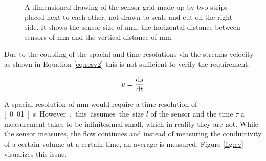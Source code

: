 \begin{figure}[H]
\begin{center}
		\caption{A dimensioned drawing of the sensor grid made up by two strips placed next to each other, not drawn to scale and cut on the right side. It shows the sensor size of \unit[10x11]{mm}, the horizontal distance between sensors of \unit[50]{mm} and the vertical distance of \unit[25]{mm}.}
		\label{fig:sensarray}
	\end{center}
\end{figure}

Due to the coupling of the spacial and time resolutions via the streams velocity as shown in Equation \eqref{eq:resv2} this is not sufficient to verify the requirement. 

\begin{equation}
	v = \dfrac{\mathop{}\!\mathrm{d} s}{\mathop{}\!\mathrm{d} t}
\label{eq:resv2} 
\end{equation}

A spacial resolution of \unit[10]{mm} would require a time resolution of \unit[0.01]{s}. However, this assumes the size $ l $ of the sensor and the time $ \tau $ a measurement takes to be infinitesimal small, which in reality they are not. While the sensor measures, the flow continues and instead of measuring the conductivity of a certain volume at a certain time, an average is measured. Figure \ref{fig:cv} visualizes this issue.

